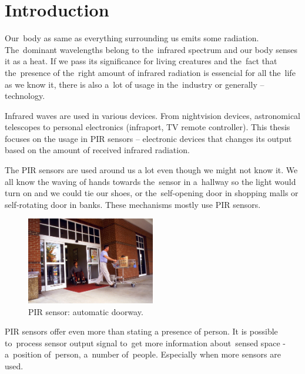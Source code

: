
\chapter{Introduction}
\label{chapter:introduction}


Our~body as same as everything surrounding us emits some radiation. The~dominant wavelengths
belong to the~infrared spectrum and our body senses it as a heat. If we pass its significance
for living creatures and the~fact that the~presence of the~right amount of infrared radiation
is essencial for all the~life as we know it, there is also a~lot of usage in the~industry or
generally -- technology.

Infrared waves are used in various devices. From nightvision devices, astronomical telescopes to personal
electronics (infraport, TV remote controller). This thesis focuses on the usage in PIR
sensors -- electronic devices that changes its output based on the amount of received infrared
radiation.

The PIR sensors are used around us a lot even though we might not know it. We all know the waving
of hands towards the~sensor in a~hallway so the light would turn on and we could tie our shoes,
or the~self-opening door in shopping malls or self-rotating door in banks. These mechanisms mostly
use PIR sensors.

\begin{figure}[h!]
  \begin{center}
    \includegraphics[width=0.5\textwidth]{img/automaticdoorway.jpg}
    \caption{PIR sensor: automatic doorway. \cite{automaticdoorway} \label{fig:automaticdoorway}}
  \end{center}
\end{figure}

PIR sensors offer even more than stating a presence of person. It is possible to~process sensor
output signal to~get more information about~sensed space - a~position of~person, a~number of~people.
Especially when more sensors are used.

